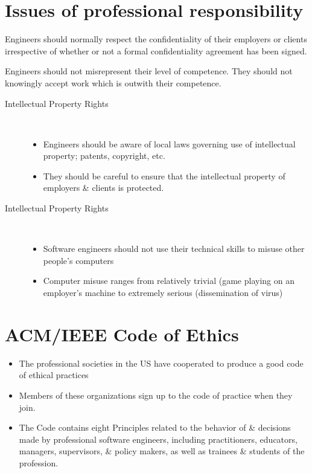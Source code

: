 \documentclass{report}
\begin{document}
\section{Issues of professional responsibility}
\begin{description}[style=multiline,leftmargin=8em]
  \item [Confidentiality] Engineers should normally respect the confidentiality of their employers or clients irrespective of whether or not a formal confidentiality agreement has been signed.
  \item [Competence] Engineers should not misrepresent their level of competence. They should not knowingly accept work which is outwith their competence.
\end{description}
\begin{description}
  \item [Intellectual Property Rights] \
  \begin{itemize}
    \item Engineers should be aware of local laws governing use of intellectual property; patents, copyright, etc.
    \item They should be careful to ensure that the intellectual property of employers \& clients is protected.
  \end{itemize}
  \item [Intellectual Property Rights] \
  \begin{itemize}
    \item Software engineers should not use their technical skills to misuse other people's computers
    \item Computer misuse ranges from relatively trivial (game playing on an employer's machine to extremely serious (dissemination of virus)
  \end{itemize}
\end{description}

\section{ACM/IEEE Code of Ethics}
\begin{itemize}
  \item The professional societies in the US have cooperated to produce a good code of ethical practices
  \item Members of these organizations sign up to the code of practice when they join.
  \item The Code contains eight Principles related to the behavior of \& decisions made by professional software engineers, including practitioners, educators, managers, supervisors, \& policy makers, as well as trainees \& students of the profession.
\end{itemize}
\end{document}
